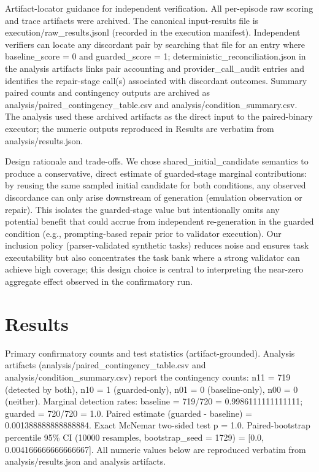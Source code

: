 \documentclass[conference]{IEEEtran}
\begin{document}
Artifact-locator guidance for independent verification. All per-episode raw scoring and trace artifacts were archived. The canonical input-results file is execution/raw\_results.jsonl (recorded in the execution manifest). Independent verifiers can locate any discordant pair by searching that file for an entry where baseline\_score = 0 and guarded\_score = 1; deterministic\_reconciliation.json in the analysis artifacts links pair accounting and provider\_call\_audit entries and identifies the repair-stage call(s) associated with discordant outcomes. Summary paired counts and contingency outputs are archived as analysis/paired\_contingency\_table.csv and analysis/condition\_summary.csv. The analysis used these archived artifacts as the direct input to the paired-binary executor; the numeric outputs reproduced in Results are verbatim from analysis/results.json.

Design rationale and trade-offs. We chose shared\_initial\_candidate semantics to produce a conservative, direct estimate of guarded-stage marginal contributions: by reusing the same sampled initial candidate for both conditions, any observed discordance can only arise downstream of generation (emulation observation or repair). This isolates the guarded-stage value but intentionally omits any potential benefit that could accrue from independent re-generation in the guarded condition (e.g., prompting-based repair prior to validator execution). Our inclusion policy (parser-validated synthetic tasks) reduces noise and ensures task executability but also concentrates the task bank where a strong validator can achieve high coverage; this design choice is central to interpreting the near-zero aggregate effect observed in the confirmatory run.

\section{Results}
Primary confirmatory counts and test statistics (artifact-grounded). Analysis artifacts (analysis/paired\_contingency\_table.csv and analysis/condition\_summary.csv) report the contingency counts: n11 = 719 (detected by both), n10 = 1 (guarded-only), n01 = 0 (baseline-only), n00 = 0 (neither). Marginal detection rates: baseline = 719/720 = 0.9986111111111111; guarded = 720/720 = 1.0. Paired estimate (guarded - baseline) = 0.001388888888888884. Exact McNemar two-sided test p = 1.0. Paired-bootstrap percentile 95\% CI (10000 resamples, bootstrap\_seed = 1729) = [0.0, 0.004166666666666667]. All numeric values below are reproduced verbatim from analysis/results.json and analysis artifacts.
\end{document}

